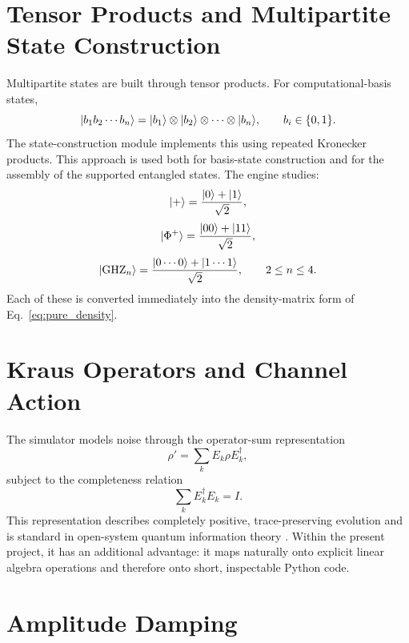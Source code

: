 \section{Tensor Products and Multipartite State Construction}

Multipartite states are built through tensor products. For computational-basis states,
\begin{equation}
\lvert b_1 b_2 \cdots b_n \rangle
=
\lvert b_1 \rangle \otimes \lvert b_2 \rangle \otimes \cdots \otimes \lvert b_n \rangle,
\qquad b_i \in \{0,1\}.
\label{eq:tensor_basis}
\end{equation}
The state-construction module implements this using repeated Kronecker products. This approach is used both for basis-state construction and for the assembly of the supported entangled states. The engine studies:
\begin{equation}
\lvert + \rangle = \frac{\lvert 0 \rangle + \lvert 1 \rangle}{\sqrt{2}},
\label{eq:plus_state}
\end{equation}
\begin{equation}
\lvert \Phi^+ \rangle = \frac{\lvert 00 \rangle + \lvert 11 \rangle}{\sqrt{2}},
\label{eq:phi_plus}
\end{equation}
\begin{equation}
\lvert \mathrm{GHZ}_n \rangle = \frac{\lvert 0\cdots 0 \rangle + \lvert 1\cdots 1 \rangle}{\sqrt{2}},
\qquad 2 \le n \le 4.
\label{eq:ghz_n}
\end{equation}
Each of these is converted immediately into the density-matrix form of Eq.~\eqref{eq:pure_density}.

\section{Kraus Operators and Channel Action}

The simulator models noise through the operator-sum representation
\begin{equation}
\rho' = \sum_k E_k \rho E_k^\dagger,
\label{eq:kraus_map}
\end{equation}
subject to the completeness relation
\begin{equation}
\sum_k E_k^\dagger E_k = I.
\label{eq:kraus_complete}
\end{equation}
This representation describes completely positive, trace-preserving evolution and is standard in open-system quantum information theory \cite{yu2006kraus}. Within the present project, it has an additional advantage: it maps naturally onto explicit linear algebra operations and therefore onto short, inspectable Python code.

\section{Amplitude Damping}

